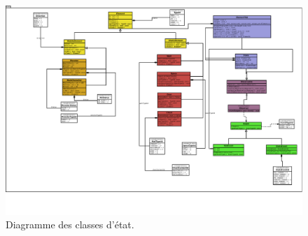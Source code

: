\documentclass[a4paper,12pt]{article}
\begin{document}
\begin{landscape}
\begin{figure}[p]
\includegraphics[width=0.9\paperheight]{state.pdf}
\caption{\label{uml:state}Diagramme des classes d'état.} 
\end{figure}
\end{landscape}
\end{document}
